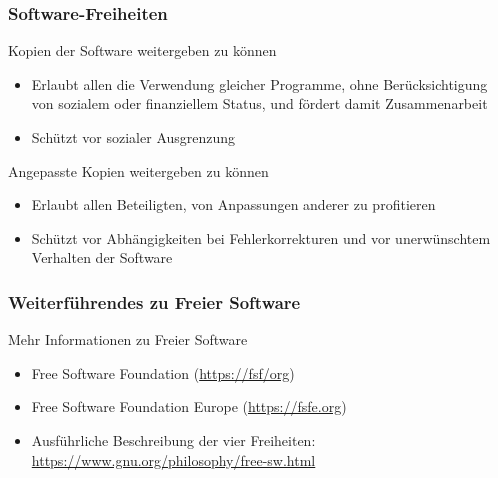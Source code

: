 \documentclass{beamer}
\begin{document}
\begin{frame}
  \frametitle{Software-Freiheiten}

  \onslide<+->

  \begin{block}{Kopien der Software weitergeben zu können}
    \begin{itemize}
    \item Erlaubt allen die Verwendung gleicher Programme, ohne Berücksichtigung
      von sozialem oder finanziellem Status, und fördert damit Zusammenarbeit
    \item Schützt vor sozialer Ausgrenzung
    \end{itemize}
  \end{block}

  \onslide<+->

  \begin{block}{Angepasste Kopien weitergeben zu können}
    \begin{itemize}
    \item Erlaubt allen Beteiligten, von Anpassungen anderer zu profitieren
    \item Schützt vor Abhängigkeiten bei Fehlerkorrekturen und vor unerwünschtem
      Verhalten der Software
    \end{itemize}
  \end{block}
\end{frame}

\begin{frame}
  \frametitle{Weiterführendes zu Freier Software}

  \onslide<+->

  \begin{block}{Mehr Informationen zu Freier Software}
    \begin{itemize}
    \item Free Software Foundation (\url{https://fsf/org})
    \item Free Software Foundation Europe (\url{https://fsfe.org})
    \item Ausführliche Beschreibung der vier Freiheiten:
      \url{https://www.gnu.org/philosophy/free-sw.html}
    \end{itemize}
  \end{block}

\end{frame}
\end{document}
